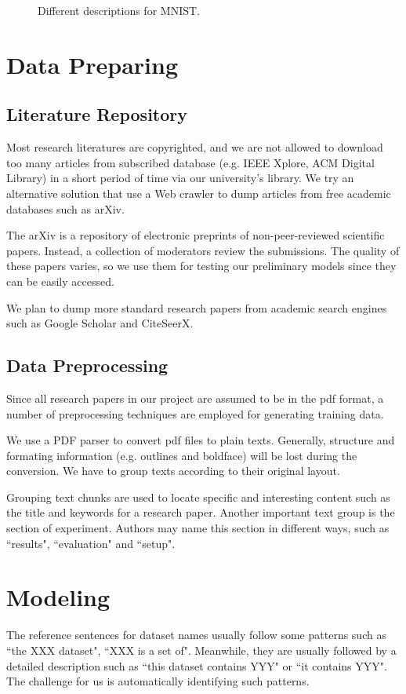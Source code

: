 \documentclass[fleqn]{article}
\begin{document}
\begin{figure}[htbp]
{{  }
}
\caption{Different descriptions for MNIST.}
\label{fig:e}
\end{figure}

\section{Data Preparing}
\subsection{Literature Repository}
Most research literatures are copyrighted, and we are not allowed to download too many articles from subscribed database (e.g. IEEE Xplore, ACM Digital Library) in a short period of time via our university's library. We try an alternative solution that use a Web crawler to dump articles from free academic databases such as arXiv.

The arXiv is a repository of electronic preprints of non-peer-reviewed scientific papers. Instead, a collection of moderators review the submissions. The quality of these papers varies, so we use them for testing our preliminary models since they can be easily accessed.

We plan to dump more standard research papers from academic search engines such as Google Scholar and CiteSeerX.

\subsection{Data Preprocessing}
Since all research papers in our project are assumed to be in the pdf format, a number of preprocessing techniques are employed for generating training data. 

We use a PDF parser to convert pdf files to plain texts. Generally, structure and formating information (e.g. outlines and boldface) will be lost during the conversion. We have to group texts according to their original layout.

Grouping text chunks are used to locate specific and interesting content such as the title and keywords for a research paper. Another important text group is the section of experiment. Authors may name this section in different ways, such as ``results", ``evaluation" and ``setup".

\section{Modeling}
The reference sentences for dataset names usually follow some patterns such as ``the XXX dataset", ``XXX is a set of". Meanwhile, they are usually followed by a detailed description such as ``this dataset contains YYY" or ``it contains YYY". The challenge for us is automatically identifying such patterns. 
\end{document}

